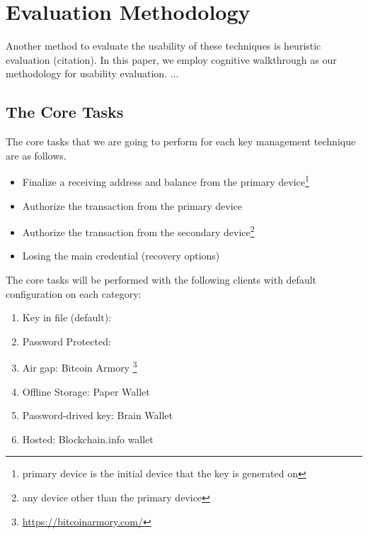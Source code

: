 
\section{Evaluation Methodology}

Another method to evaluate the usability of these techniques is heuristic evaluation (citation). In this paper, we employ cognitive walkthrough as our methodology for usability evaluation.
... 


\subsection {The Core Tasks}
The core tasks that we are going to perform for each key management technique are as follows.

\begin{itemize}
\renewcommand{\labelitemi}{\bf CT-1} \label{sec:ct-1}
\item Finalize a receiving address and balance from the primary device\footnote{primary device is the initial device that the key is generated on} 
\renewcommand{\labelitemi}{\bf CT-2} \label{sec:ct-2}
\item Authorize the transaction from the primary device 
\renewcommand{\labelitemi}{\bf CT-3} \label{sec:ct-3}
\item Authorize the transaction from the secondary device\footnote{any device other than the primary device}
\renewcommand{\labelitemi}{\bf CT-4} \label{sec:ct-4}
\item Losing the main credential (recovery options)
\end{itemize}

The core tasks will be performed with the following clients with default configuration on each category:

\begin{enumerate}
\item Key in file (default):  \bitcoinclient 
\item Password Protected: \multibit 
\item Air gap: Bitcoin Armory \footnote{\url{https://bitcoinarmory.com/}}
\item Offline Storage: Paper Wallet
\item Password-drived key: Brain Wallet
\item Hosted: Blockchain.info wallet

\end{enumerate}


